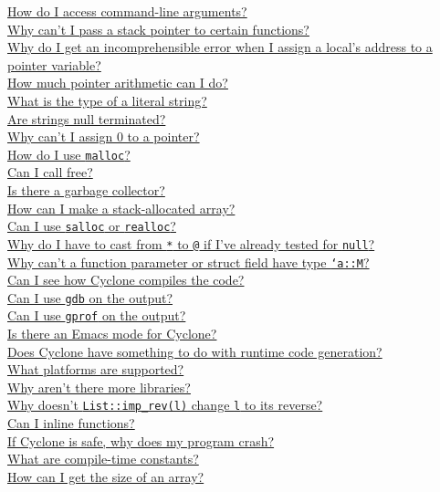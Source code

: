 \begin{small}
\hyperlink{faq:commandline}{How do I access command-line arguments?}\\
\hyperlink{faq:stackpointer}{Why can't I pass a stack pointer to certain functions?}\\
\hyperlink{faq:localaddress}{Why do I get an incomprehensible error when I assign a local's address to a pointer variable?}\\
\hyperlink{faq:pointerarith}{How much pointer arithmetic can I do?}\\
\hyperlink{faq:litstring}{What is the type of a literal string?}\\
\hyperlink{faq:nullterminate}{Are strings null terminated?}\\
\hyperlink{faq:zero}{Why can't I assign 0 to a pointer?}\\
\hyperlink{faq:malloc}{How do I use \texttt{malloc}?}\\
\hyperlink{faq:free}{Can I call free?}\\
\hyperlink{faq:gc}{Is there a garbage collector?}\\
\hyperlink{faq:stackalloc}{How can I make a stack-allocated array?}\\
\hyperlink{faq:realloc}{Can I use \texttt{salloc} or \texttt{realloc}?}\\
\hyperlink{faq:nullcast}{Why do I have to cast from \texttt{*} to \texttt{@} if I've already tested for \texttt{null}?}\\
\hyperlink{faq:memkind}{Why can't a function parameter or struct field have type \texttt{`a::M}?}\\
\hyperlink{faq:compile}{Can I see how Cyclone compiles the code?}\\
\hyperlink{faq:gdb}{Can I use \texttt{gdb} on the output?}\\
\hyperlink{faq:gprof}{Can I use \texttt{gprof} on the output?}\\
\hyperlink{faq:emacs}{Is there an Emacs mode for Cyclone?}\\
\hyperlink{faq:rtcg}{Does Cyclone have something to do with runtime code generation?}\\
\hyperlink{faq:platforms}{What platforms are supported?}\\
\hyperlink{faq:libs}{Why aren't there more libraries?}\\
\hyperlink{faq:imprev}{Why doesn't \texttt{List::imp_rev(l)} change \texttt{l} to its reverse?}\\
\hyperlink{faq:inline}{Can I inline functions?}\\
\hyperlink{faq:crash}{If Cyclone is safe, why does my program crash?}\\
\hyperlink{faq:ctc}{What are compile-time constants?}\\
\hyperlink{faq:arraysize}{How can I get the size of an array?}
\end{small}
\fi


